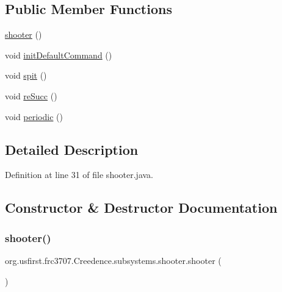 \subsection*{Public Member Functions}
\begin{DoxyCompactItemize}
\item 
\mbox{\hyperlink{classorg_1_1usfirst_1_1frc3707_1_1_creedence_1_1subsystems_1_1shooter_ad85091b52181340af69c7443392753a0}{shooter}} ()
\item 
void \mbox{\hyperlink{classorg_1_1usfirst_1_1frc3707_1_1_creedence_1_1subsystems_1_1shooter_a4f818d387905b59f78da999aefaad97c}{init\+Default\+Command}} ()
\item 
void \mbox{\hyperlink{classorg_1_1usfirst_1_1frc3707_1_1_creedence_1_1subsystems_1_1shooter_aceb2e8874f3af96e152354ed33c96e9a}{spit}} ()
\item 
void \mbox{\hyperlink{classorg_1_1usfirst_1_1frc3707_1_1_creedence_1_1subsystems_1_1shooter_aa4b8b7e6288a9769556079c607407592}{re\+Succ}} ()
\item 
void \mbox{\hyperlink{classorg_1_1usfirst_1_1frc3707_1_1_creedence_1_1subsystems_1_1shooter_a8a843c1a40fa5e5d65f33d1ee1298a32}{periodic}} ()
\end{DoxyCompactItemize}


\subsection{Detailed Description}


Definition at line 31 of file shooter.\+java.



\subsection{Constructor \& Destructor Documentation}
\mbox{\label{classorg_1_1usfirst_1_1frc3707_1_1_creedence_1_1subsystems_1_1shooter_ad85091b52181340af69c7443392753a0}} 
\subsubsection{\texorpdfstring{shooter()}{shooter()}}
{\footnotesize\ttfamily org.\+usfirst.\+frc3707.\+Creedence.\+subsystems.\+shooter.\+shooter (\begin{DoxyParamCaption}{ }\end{DoxyParamCaption})}



